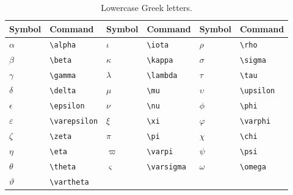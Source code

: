 \begin{table}[H]
	\centering
	\caption{Lowercase Greek letters.}
	\label{tab:greek-lower}
	\begin{tabular}{@{}llllll@{}}
		\toprule
		Symbol & Command & Symbol & Command & Symbol & Command \\
		\midrule
		$\alpha$      & \texttt{\textbackslash alpha}      & $\iota$      & \texttt{\textbackslash iota}       & $\rho$       & \texttt{\textbackslash rho}        \\
		$\beta$       & \texttt{\textbackslash beta}       & $\kappa$     & \texttt{\textbackslash kappa}      & $\sigma$     & \texttt{\textbackslash sigma}      \\
		$\gamma$      & \texttt{\textbackslash gamma}      & $\lambda$    & \texttt{\textbackslash lambda}     & $\tau$       & \texttt{\textbackslash tau}        \\
		$\delta$      & \texttt{\textbackslash delta}      & $\mu$        & \texttt{\textbackslash mu}         & $\upsilon$   & \texttt{\textbackslash upsilon}    \\
		$\epsilon$    & \texttt{\textbackslash epsilon}    & $\nu$        & \texttt{\textbackslash nu}         & $\phi$       & \texttt{\textbackslash phi}        \\
		$\varepsilon$ & \texttt{\textbackslash varepsilon} & $\xi$        & \texttt{\textbackslash xi}         & $\varphi$    & \texttt{\textbackslash varphi}     \\
		$\zeta$       & \texttt{\textbackslash zeta}       & $\pi$        & \texttt{\textbackslash pi}         & $\chi$       & \texttt{\textbackslash chi}        \\
		$\eta$        & \texttt{\textbackslash eta}        & $\varpi$     & \texttt{\textbackslash varpi}      & $\psi$       & \texttt{\textbackslash psi}        \\
		$\theta$      & \texttt{\textbackslash theta}      & $\varsigma$  & \texttt{\textbackslash varsigma}   & $\omega$     & \texttt{\textbackslash omega}      \\
		$\vartheta$   & \texttt{\textbackslash vartheta}   &              &                                    &              &                                    \\
		\bottomrule
	\end{tabular}
\end{table}

